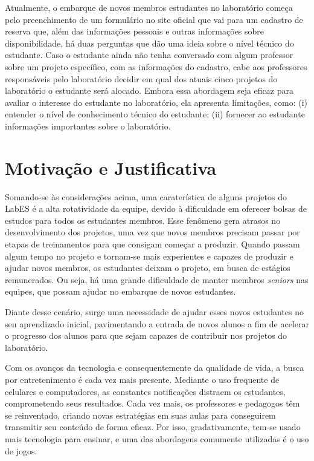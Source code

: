 Atualmente, o embarque de novos membros estudantes no laboratório começa pelo preenchimento de um formulário no site oficial que vai para um cadastro de reserva que, além das informações pessoais e outras informações sobre disponibilidade, há duas perguntas que dão uma ideia sobre o nível técnico do estudante. Caso o estudante ainda não tenha conversado com algum professor sobre um projeto específico, com as informações do cadastro, cabe aos professores responsáveis pelo laboratório decidir em qual dos atuais cinco projetos do laboratório o estudante será alocado.  Embora essa abordagem seja eficaz para avaliar o interesse do estudante no laboratório, ela apresenta limitações, como: (i) entender o nível de conhecimento técnico do estudante; (ii) fornecer ao estudante informações importantes sobre o laboratório.


\section{Motivação e Justificativa}
\label{sec-intro-motjus}
Somando-se às considerações acima, uma caraterística de alguns projetos do LabES é a alta rotatividade da equipe, devido à dificuldade em oferecer bolsas de estudos para todos os estudantes membros. Esse fenômeno gera atrasos no desenvolvimento dos projetos, uma vez que novos membros precisam passar por etapas de treinamentos para que consigam começar a produzir. Quando passam algum tempo no projeto e tornam-se mais experientes e capazes de produzir e ajudar novos membros, os estudantes deixam o projeto, em busca de estágios remunerados. Ou seja, há uma grande dificuldade de manter membros \textit{seniors} nas equipes, que possam ajudar no embarque de novos estudantes. 

Diante desse cenário, surge uma necessidade de ajudar esses novos estudantes no seu aprendizado inicial, pavimentando a entrada de novos alunos a fim de acelerar o progresso dos alunos para que sejam capazes de contribuir nos projetos do laboratório.

Com os avanços da tecnologia e consequentemente da qualidade de vida, a busca por entretenimento é cada vez mais presente. Mediante o uso frequente de celulares e computadores, as constantes notificações distraem os estudantes, comprometendo seus resultados. Cada vez mais, os professores e pedagogos têm se reinventado, criando novas estratégias em suas aulas para conseguirem transmitir seu conteúdo de forma eficaz. Por isso, gradativamente, tem-se usado mais tecnologia para ensinar, e uma das abordagens comumente utilizadas é o uso de jogos. 

